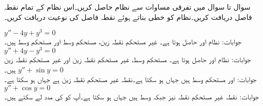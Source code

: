 سوال  تا سوال  میں تفرقی مساوات سے نظام حاصل کریں۔اس نظام کے تمام نقطہ فاصل دریافت کریں۔نظام کو خطی بناتے ہوئے نقطہ فاصل کی نوعیت دریافت کریں۔

\quad 
$y''-4y+y^3=0$\\
جوابات: نظام  اور  حاصل ہوتا ہے۔ غیر مستحکم نقطہ زین،  مستحکم وسط اور  مستحکم وسط ہیں۔
\quad 
$y''+4y-y^3=0$\\
جوابات: نظام  اور  حاصل ہوتا ہے۔ مستحکم وسط،  غیر مستحکم نقطہ زین اور  غیر مستحکم نقطہ زین ہیں۔
\quad 
$y''+\sin y=0$\\
جوابات:  اور  مستحکم وسط ہیں جہاں  ہو سکتا ہے۔نقطہ  غیر مستحکم نقطہ زین ہے جہاں  ہو سکتا ہے۔
\quad 
$y''+\cos y=0$\\
جوابات: نقطہ  غیر مستحکم نقطہ نیز  جبکہ  وسط ہیں جہاں  ہو سکتا ہے۔آپ کو  کی مدد لے سکتے ہیں۔

